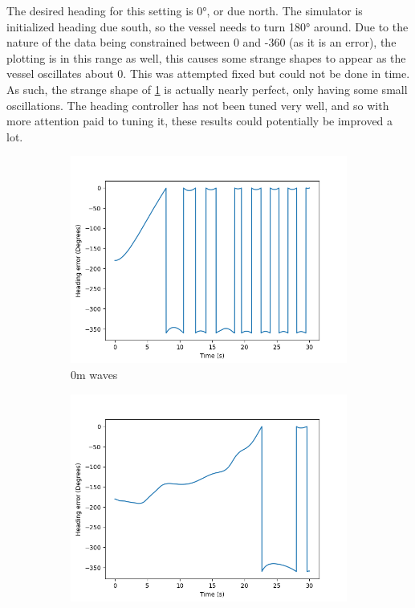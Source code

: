 \documentclass[class=article, crop=false]{standalone}
\begin{document}
The desired heading for this setting is 0°, or due north. The simulator is initialized heading due south, so the vessel needs to turn 180° around. Due to the nature of the data being constrained between 0 and -360 (as it is an error), the plotting is in this range as well, this causes some strange shapes to appear as the vessel oscillates about 0. This was attempted fixed but could not be done in time. As such, the strange shape of \cref{fig:heading_error_0m} is actually nearly perfect, only having some small oscillations. The heading controller has not been tuned very well, and so with more attention paid to tuning it, these results could potentially be improved a lot.

\begin{figure}
    \centering
    \begin{subfigure}{0.65\textwidth}
        \centering
        \includegraphics{scenario1/rov-50m/0.0m/usv_heading_error_controlled}
        \caption{0m waves}
        \label{fig:heading_error_0m}
    \end{subfigure}
    \vfill
    \begin{subfigure}{0.65\textwidth}
        \centering
        \includegraphics{scenario1/rov-50m/0.5m/usv_heading_error_controlled}

\end{subfigure}
\end{figure}
\end{document}
